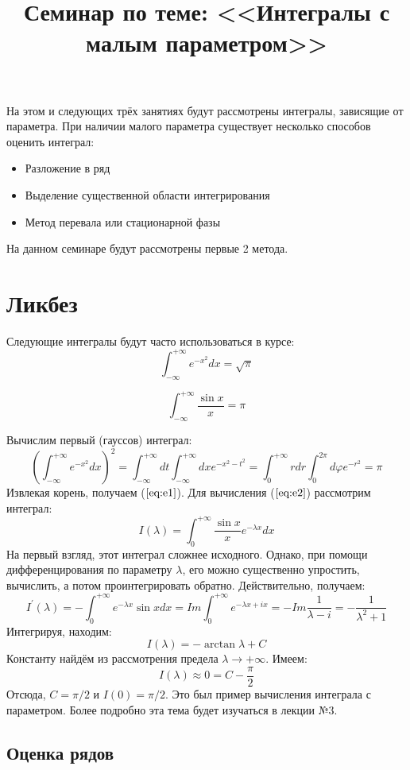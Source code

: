 \documentclass[a4paper,12pt]{article}
\begin{document}
\title{Семинар по теме: <<Интегралы с малым параметром>>}

\maketitle
На этом и следующих трёх занятиях будут рассмотрены интегралы, зависящие от параметра. При наличии малого параметра существует несколько способов оценить интеграл:
\begin{itemize}
	\item Разложение в ряд
	\item Выделение существенной области интегрирования
	\item Метод перевала или стационарной фазы
\end{itemize}
На данном семинаре будут рассмотрены первые 2 метода.
\section*{Ликбез}
Следующие интегралы будут часто использоваться в курсе:
\begin{equation}\label{eq:e1}
\int_{-\infty}^{+\infty} e^{-x^2} dx= \sqrt{\pi}
\end{equation}

\begin{equation}\label{eq:e2}
\int_{-\infty}^{+\infty} \frac{\sin x}{x}=\pi
\end{equation}

Вычислим первый (гауссов) интеграл:
$$
\left(\int_{-\infty}^{+\infty} e^{-x^2} dx\right)^2=\int_{-\infty}^{+\infty} dt \int_{-\infty}^{+\infty} dx e^{-x^2-t^2}=\int_{0}^{+\infty} r dr \int_{0}^{2\pi} d\varphi e^{-r^2}=\pi
$$
Извлекая корень, получаем ($\ref{eq:e1}$). Для вычисления ($\ref{eq:e2}$) рассмотрим интеграл:
$$
I(\lambda)=\int_{0}^{+\infty}\frac{\sin x}{x}e^{-\lambda x} dx
$$
На первый взгляд, этот интеграл сложнее исходного. Однако, при помощи дифференцирования по параметру $\lambda$, его можно существенно упростить, вычислить, а потом проинтегрировать обратно. Действительно, получаем:
$$
I^{'}(\lambda)=-\int_{0}^{+\infty}e^{-\lambda x}\sin x dx=Im\int_{0}^{+\infty}e^{-\lambda x+ix}=-Im\frac{1}{\lambda-i}=-\frac{1}{\lambda^2+1}
$$
Интегрируя, находим:
$$
I(\lambda)=-\arctan\lambda+C
$$
Константу найдём из рассмотрения предела $\lambda\to+\infty$. Имеем:
$$
I(\lambda)\approx0=C-\frac{\pi}{2}
$$
Отсюда, $C=\pi/2$ и $I(0)=\pi/2$.
Это был пример вычисления интеграла с параметром. Более подробно эта тема будет изучаться в лекции №3.

\subsection*{Оценка рядов}
\end{document}
